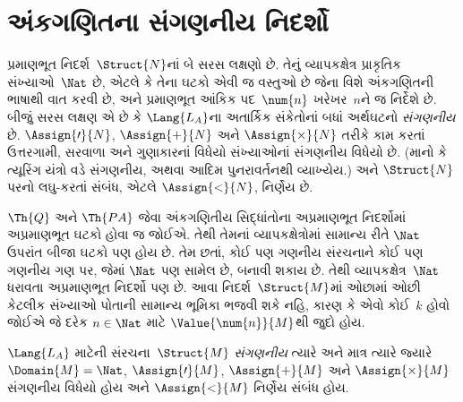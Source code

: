 \begingroup
\makeatletter{}\makeatother

\section{અંકગણિતના સંગણનીય નિદર્શો}
\label{guunit:OLP-0197}


\begin{explain}
પ્રમાણભૂત નિદર્શ~$\Struct{N}$નાં બે સરસ લક્ષણો છે. તેનું
વ્યાપકક્ષેત્ર પ્રાકૃતિક સંખ્યાઓ~$\Nat$ છે, એટલે કે તેના ઘટકો એવી જ
વસ્તુઓ છે જેના વિશે અંકગણિતની ભાષાથી વાત કરવી છે, અને પ્રમાણભૂત આંકિક
પદ~$\num{n}$ ખરેખર~$n$ને જ નિર્દેશે છે. બીજું સરસ લક્ષણ એ છે કે
$\Lang{L_A}$ના અતાર્કિક સંકેતોનાં બધાં અર્થઘટનો \emph{સંગણનીય} છે.
$\Assign{\prime}{N}$, $\Assign{+}{N}$ અને $\Assign{\times}{N}$ તરીકે
કામ કરતાં ઉત્તરગામી, સરવાળા અને ગુણાકારનાં વિધેયો સંખ્યાઓનાં સંગણનીય
વિધેયો છે. (માનો કે ત્યૂરિંગ યંત્રો વડે સંગણનીય, અથવા આદિમ
પુનરાવર્તનથી વ્યાખ્યેય.) અને $\Struct{N}$ પરનો લઘુ-કરતાં સંબંધ, એટલે
$\Assign{<}{N}$, નિર્ણેય છે.

$\Th{Q}$ અને $\Th{PA}$ જેવા અંકગણિતીય સિદ્ધાંતોના અપ્રમાણભૂત
નિદર્શોમાં અપ્રમાણભૂત ઘટકો હોવા જ જોઈએ. તેથી તેમનાં વ્યાપકક્ષેત્રોમાં
સામાન્ય રીતે $\Nat$ ઉપરાંત બીજા ઘટકો પણ હોય છે. તેમ છતાં, કોઈ
પણ ગણનીય સંરચનાને કોઈ પણ ગણનીય ગણ પર, જેમાં $\Nat$
પણ સામેલ છે, બનાવી શકાય છે. તેથી વ્યાપકક્ષેત્ર~$\Nat$ ધરાવતા
અપ્રમાણભૂત નિદર્શો પણ છે. આવા નિદર્શ~$\Struct{M}$માં ઓછામાં ઓછી કેટલીક
સંખ્યાઓ પોતાની સામાન્ય ભૂમિકા ભજવી શકે નહિ, કારણ કે એવો કોઈ~$k$ હોવો
જોઈએ જે દરેક $n\in\Nat$ માટે $\Value{\num{n}}{M}$થી જુદો હોય.
\end{explain}

\begin{defn}
$\Lang{L_A}$ માટેની સંરચના~$\Struct{M}$ \emph{સંગણનીય}
ત્યારે અને માત્ર ત્યારે જ્યારે $\Domain{M}=\Nat$,
$\Assign{\prime}{M}$, $\Assign{+}{M}$ અને $\Assign{\times}{M}$
સંગણનીય વિધેયો હોય અને $\Assign{<}{M}$ નિર્ણેય સંબંધ હોય.
\end{defn}

